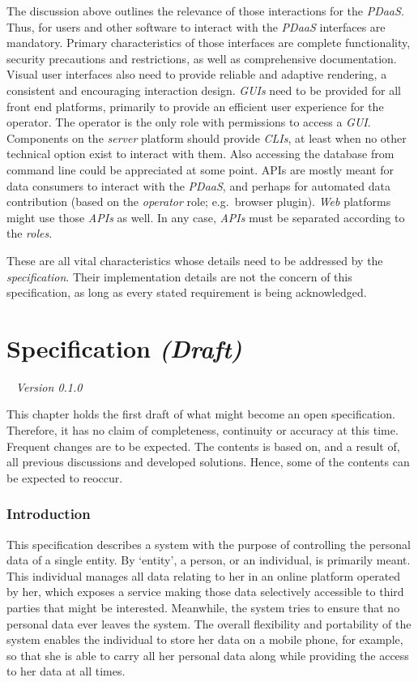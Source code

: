 \documentclass[12pt,english,a4paper,titlepage,cleardoublepage=empty,dottedtoc]{report}
\begin{document}
The discussion above outlines the relevance of those interactions for
the \emph{PDaaS}. Thus, for users and other software to interact with
the \emph{PDaaS} interfaces are mandatory. Primary characteristics of
those interfaces are complete functionality, security precautions and
restrictions, as well as comprehensive documentation. Visual user
interfaces also need to provide reliable and adaptive rendering, a
consistent and encouraging interaction design. \emph{GUIs} need to be
provided for all front end platforms, primarily to provide an efficient
user experience for the operator. The operator is the only role with
permissions to access a \emph{GUI}. Components on the \emph{server}
platform should provide \emph{CLIs}, at least when no other technical
option exist to interact with them. Also accessing the database from
command line could be appreciated at some point. APIs are mostly meant
for data consumers to interact with the \emph{PDaaS}, and perhaps for
automated data contribution (based on the \emph{operator} role;
e.g.~browser plugin). \emph{Web} platforms might use those \emph{APIs}
as well. In any case, \emph{APIs} must be separated according to the
\emph{roles}.

These are all vital characteristics whose details need to be addressed
by the \emph{specification}. Their implementation details are not the
concern of this specification, as long as every stated requirement is
being acknowledged.

\chapter{\texorpdfstring{Specification
\emph{(Draft)}}{Specification (Draft)}}\label{specification-draft}

\hfill~ \emph{Version 0.1.0}

This chapter holds the first draft of what might become an open
specification. Therefore, it has no claim of completeness, continuity or
accuracy at this time. Frequent changes are to be expected. The contents
is based on, and a result of, all previous discussions and developed
solutions. Hence, some of the contents can be expected to reoccur.

\subsection*{Introduction}\label{introduction-1}

This specification describes a system with the purpose of controlling
the personal data of a single entity. By `entity', a person, or an
individual, is primarily meant. This individual manages all data
relating to her in an online platform operated by her, which exposes a
service making those data selectively accessible to third parties that
might be interested. Meanwhile, the system tries to ensure that no
personal data ever leaves the system. The overall flexibility and
portability of the system enables the individual to store her data on a
mobile phone, for example, so that she is able to carry all her personal
data along while providing the access to her data at all times.
\end{document}
